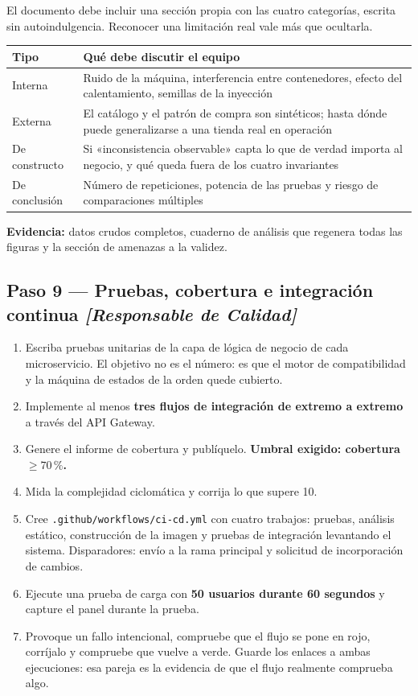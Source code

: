 \documentclass[11pt,a4paper]{article}
\newcommand{\paso}[1]{\subsection{#1}}
\begin{document}
	El documento debe incluir una sección propia con las cuatro categorías, escrita sin autoindulgencia. Reconocer una limitación real vale más que ocultarla.
	
	\begin{center}
		\small
		\begin{tabular}{@{}p{3.0cm}p{11.9cm}@{}}
			\toprule
			\textbf{Tipo} & \textbf{Qué debe discutir el equipo} \\
			\midrule
			Interna & Ruido de la máquina, interferencia entre contenedores, efecto del calentamiento, semillas de la inyección \\
			\addlinespace
			Externa & El catálogo y el patrón de compra son sintéticos; hasta dónde puede generalizarse a una tienda real en operación \\
			\addlinespace
			De constructo & Si «inconsistencia observable» capta lo que de verdad importa al negocio, y qué queda fuera de los cuatro invariantes \\
			\addlinespace
			De conclusión & Número de repeticiones, potencia de las pruebas y riesgo de comparaciones múltiples \\
			\bottomrule
		\end{tabular}
	\end{center}
	
	\textbf{Evidencia:} datos crudos completos, cuaderno de análisis que regenera todas las figuras y la sección de amenazas a la validez.
	
	\paso{Paso 9 --- Pruebas, cobertura e integración continua \emph{[Responsable de Calidad]}}
	
	\begin{enumerate}[leftmargin=*,itemsep=4pt]
		\item Escriba pruebas unitarias de la capa de lógica de negocio de cada microservicio. El objetivo no es el número: es que el motor de compatibilidad y la máquina de estados de la orden quede cubierto.
		\item Implemente al menos \textbf{tres flujos de integración de extremo a extremo} a través del API Gateway.
		\item Genere el informe de cobertura y publíquelo. \textbf{Umbral exigido: cobertura $\geq 70\,\%$.}
		\item Mida la complejidad ciclomática y corrija lo que supere 10.
		\item Cree \texttt{.github/workflows/ci-cd.yml} con cuatro trabajos: pruebas, análisis estático, construcción de la imagen y pruebas de integración levantando el sistema. Disparadores: envío a la rama principal y solicitud de incorporación de cambios.
		\item Ejecute una prueba de carga con \textbf{50 usuarios durante 60 segundos} y capture el panel durante la prueba.
		\item Provoque un fallo intencional, compruebe que el flujo se pone en rojo, corríjalo y compruebe que vuelve a verde. Guarde los enlaces a ambas ejecuciones: esa pareja es la evidencia de que el flujo realmente comprueba algo.
	\end{enumerate}
	
\end{document}
